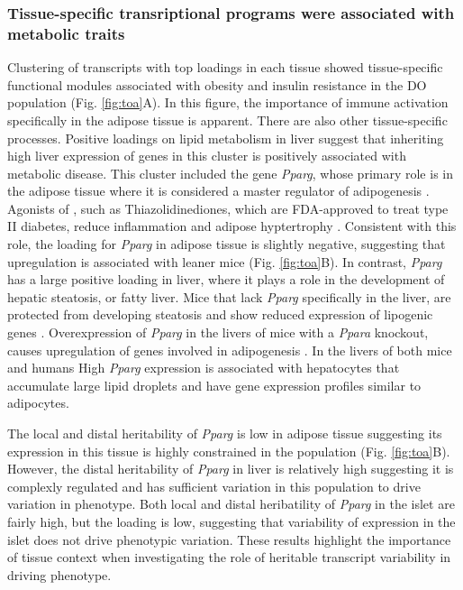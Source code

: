 \documentclass[
]{article}
\begin{document}
\subsubsection{Tissue-specific transriptional programs were associated
with metabolic
traits}\label{tissue-specific-transriptional-programs-were-associated-with-metabolic-traits}

Clustering of transcripts with top loadings in each tissue showed
tissue-specific functional modules associated with obesity and insulin
resistance in the DO population (Fig. \ref{fig:toa}A). In this figure,
the importance of immune activation specifically in the adipose tissue
is apparent. There are also other tissue-specific processes. Positive
loadings on lipid metabolism in liver suggest that inheriting high liver
expression of genes in this cluster is positively associated with
metabolic disease. This cluster included the gene \textit{Pparg}, whose
primary role is in the adipose tissue where it is considered a master
regulator of adipogenesis \cite{pmid17389767}. Agonists of ,
such as Thiazolidinediones, which are FDA-approved to treat type II
diabetes, reduce inflammation and adipose hyptertrophy
\cite{pmid17389767}. Consistent with this role, the loading for
\textit{Pparg} in adipose tissue is slightly negative, suggesting that
upregulation is associated with leaner mice (Fig. \ref{fig:toa}B). In
contrast, \textit{Pparg} has a large positive loading in liver, where it
plays a role in the development of hepatic steatosis, or fatty liver.
Mice that lack \textit{Pparg} specifically in the liver, are protected
from developing steatosis and show reduced expression of lipogenic genes
\cite{pmid12805374, pmid12618528}. Overexpression of \textit{Pparg} in
the livers of mice with a \textit{Ppara} knockout, causes upregulation
of genes involved in adipogenesis \cite{pmid16357043}. In the livers of
both mice and humans \cite{pmid15644454, pmid16403437} High
\textit{Pparg} expression is associated with hepatocytes that accumulate
large lipid droplets and have gene expression profiles similar to
adipocytes.

The local and distal heritability of \textit{Pparg} is low in adipose
tissue suggesting its expression in this tissue is highly constrained in
the population (Fig. \ref{fig:toa}B). However, the distal heritability
of \textit{Pparg} in liver is relatively high suggesting it is complexly
regulated and has sufficient variation in this population to drive
variation in phenotype. Both local and distal heribatility of
\textit{Pparg} in the islet are fairly high, but the loading is low,
suggesting that variability of expression in the islet does not drive
phenotypic variation. These results highlight the importance of tissue
context when investigating the role of heritable transcript variability
in driving phenotype.
\end{document}
